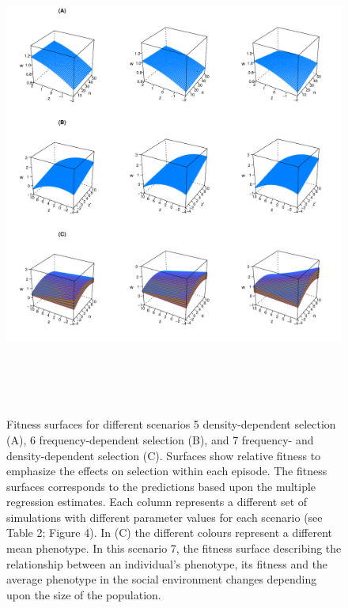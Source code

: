 \documentclass{article}
\begin{document}
\begin{figure}[h] 
	\centering
	\includegraphics[width=16cm, height=16cm]{Figures/Fig5.pdf}
	\caption{Fitness surfaces for different scenarios 5 density-dependent selection (A), 6 frequency-dependent selection (B), and 7 frequency- and density-dependent selection (C). Surfaces show relative fitness to emphasize the effects on selection within each episode. The fitness surfaces corresponds to the predictions based upon the multiple regression estimates. Each column represents a different set of simulations with different parameter values for each scenario (see Table 2; Figure 4). In (C) the different colours represent a different mean phenotype. In this scenario 7, the fitness surface describing the relationship between an individual's phenotype, its fitness and the average phenotype in the social environment changes depending upon the size of the population.} 
	\label{fig:surface}
\end{figure}
\end{document}
